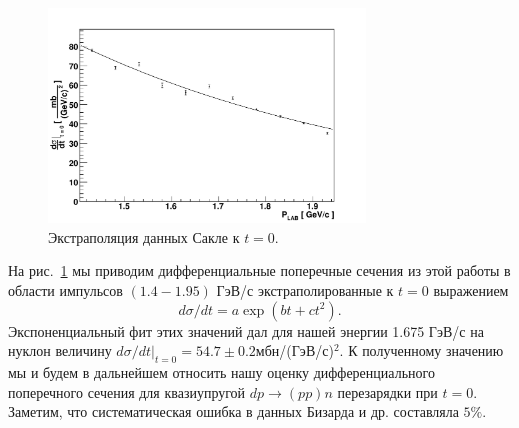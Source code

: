 \documentclass[a4paper,12pt]{article}
\begin{document}
\begin{figure}[hp]
  \centering
  \includegraphics[width=0.75\textwidth]{fig_bizard.pdf}
  \caption {Экстраполяция данных Сакле к $t = 0$.}
  \label{f_biz}
\end{figure}

На рис.~\ref{f_biz} мы приводим дифференциальные поперечные сечения из
этой работы в области импульсов $(1.4 - 1.95)$ ГэВ/с
экстраполированные к $t = 0$ выражением
\begin{displaymath}
  d\sigma/dt = a \exp(bt+ct^2).
\end{displaymath}
Экспоненциальный фит этих значений дал для нашей энергии 1.675 ГэВ/с
на нуклон величину $d\sigma/dt|_{t=0} = 54.7 \pm
0.2$мбн/(ГэВ/с)$^{2}$. К полученному значению мы и будем в дальнейшем
относить нашу оценку дифференциального поперечного сечения для
квазиупругой $dp\to(pp)n$ перезарядки при $t = 0$.  Заметим, что
систематическая ошибка в данных Бизарда и др.  составляла $5\%$.
\end{document}
